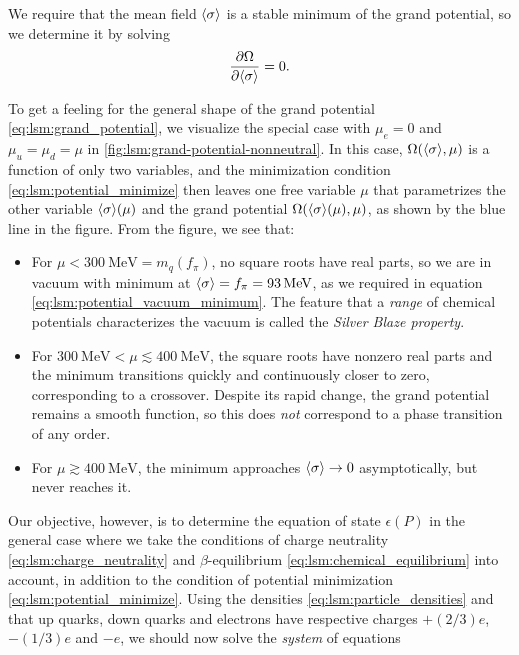 We require that the mean field $\langle \sigma \rangle$ is a stable minimum of the grand potential,
so we determine it by solving
\begin{equation}
	\pdv{\Omega}{ \langle \sigma \rangle} = 0.
\label{eq:lsm:potential_minimize}
\end{equation}

To get a feeling for the general shape of the grand potential \eqref{eq:lsm:grand_potential}, we visualize the special case with $\mu_e = 0$ and $\mu_u = \mu_d = \mu$ in \cref{fig:lsm:grand-potential-nonneutral}.
In this case, $\Omega(\langle \sigma \rangle,\mu)$ is a function of only two variables, and the minimization condition \eqref{eq:lsm:potential_minimize} then leaves one free variable $\mu$ that parametrizes the other variable $\langle \sigma \rangle(\mu)$ and the grand potential $\Omega(\langle \sigma \rangle(\mu),\mu)$, as shown by the blue line in the figure.
From the figure, we see that:
\begin{itemize}
\item For $\mu < \SI{300}{\mega\electronvolt} = m_q(f_\pi)$, no square roots have real parts, so we are in vacuum with minimum at $\langle \sigma \rangle = f_\pi = \SI{93}{\mega\electronvolt}$, as we required in equation \eqref{eq:lsm:potential_vacuum_minimum}.
      The feature that a \emph{range} of chemical potentials characterizes the vacuum is called the \emph{Silver Blaze property}.
\item For $\SI{300}{\mega\electronvolt} < \mu \lesssim \SI{400}{\mega\electronvolt}$, the square roots have nonzero real parts and the minimum transitions quickly and continuously closer to zero, corresponding to a crossover.
      Despite its rapid change, the grand potential remains a smooth function, so this does \emph{not} correspond to a phase transition of any order.
\item For $\mu \gtrsim \SI{400}{\mega\electronvolt}$, the minimum approaches $\langle \sigma \rangle \rightarrow 0$ asymptotically, but never reaches it.
\end{itemize}
Our objective, however, is to determine the equation of state $\epsilon(P)$ in the general case where we take the conditions of charge neutrality \eqref{eq:lsm:charge_neutrality} and $\beta$-equilibrium \eqref{eq:lsm:chemical_equilibrium} into account, in addition to the condition of potential minimization \eqref{eq:lsm:potential_minimize}.
Using the densities \eqref{eq:lsm:particle_densities} and that up quarks, down quarks and electrons have respective charges $+(2/3)e$, $-(1/3)e$ and $-e$, we should now solve the \emph{system} of equations
